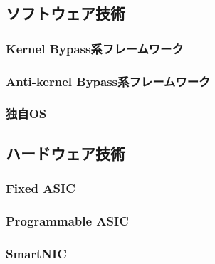 \subsection{ソフトウェア技術}
\subsubsection{Kernel Bypass系フレームワーク}

\subsubsection{Anti-kernel Bypass系フレームワーク}

\subsubsection{独自OS}

\subsection{ハードウェア技術}
\subsubsection{Fixed ASIC}
\subsubsection{Programmable ASIC}
\subsubsection{SmartNIC}



